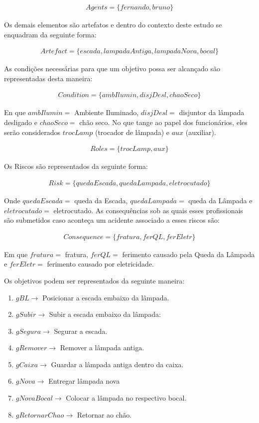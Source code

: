 \begin{eqnarray}\label{agentesintrodutorycase} \nonumber
	Agents = \{ fernando, bruno \}
\end{eqnarray}

Os demais elementos são artefatos e dentro do contexto deste estudo se enquadram da seguinte forma:

\begin{eqnarray}
	Artefact = \{ escada, lampadaAntiga, lampadaNova, bocal \} \nonumber
\end{eqnarray}

As condições necessárias para que um objetivo possa ser alcançado são representadas desta maneira: 

\begin{eqnarray}
	Condition = \{ ambIlumin, disjDesl, chaoSeco \} \nonumber
\end{eqnarray}

En que $ambIlumin =$ Ambiente Iluminado, $disjDesl = $ disjuntor da lâmpada desligado e $chaoSeco = $ chão seco. No que tange ao papel dos funcionários, eles serão considerados $trocLamp$ (trocador de lâmpada) e $aux$ (auxiliar).

\begin{eqnarray}
	Roles = \{ trocLamp,aux \}
\end{eqnarray}

Os Riscos são representados da seguinte forma: 

\begin{eqnarray}
	Risk = \{ quedaEscada, quedaLampada, eletrocutado \}
\end{eqnarray}

Onde $quedaEscada =$ queda da Escada, $quedaLampada =$ queda da Lâmpada e $eletrocutado =$ eletrocutado. As consequências sob as quais esses profissionais são submetidos caso aconteça um acidente associado a esses riscos são:

\begin{eqnarray}
	Consequence = \{fratura,ferQL, ferEletr\}
\end{eqnarray}

Em que $fratura =$ fratura, $ferQL =$ ferimento causado pela Queda da Lâmpada e $ferEletr =$ ferimento causado por eletricidade.

Os objetivos podem ser representados da seguinte maneira: 

\begin{enumerate}
	\item $gBL \to $ Posicionar a escada embaixo da lâmpada.
	\item $gSubir \to $ Subir a escada embaixo da lâmpada:
	\item $gSegura \to $ Segurar a escada. 
	\item $gRemover \to $ Remover a lâmpada antiga.
	\item $gCaixa \to $ Guardar a lâmpada antiga dentro da caixa.
	\item $gNova \to $ Entregar lâmpada nova
	\item $gNovaBocal \to$ Colocar a lâmpada no respectivo bocal.
	\item $gRetornarChao \to$ Retornar ao chão.
\end{enumerate}

